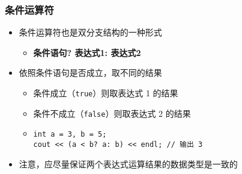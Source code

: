 \begin{frame}[fragile]
    \frametitle{条件运算符}

    \begin{itemize}[<+->]
        \item 条件运算符也是双分支结构的一种形式

            \begin{itemize}
                \item \textbf{条件语句? \enspace 表达式1: \enspace 表达式2}
            \end{itemize}

        \item 依照条件语句是否成立，取不同的结果 

            \begin{itemize}
                \item 条件成立（\lstinline|true|）则取表达式 1 的结果
                \item 条件不成立（\lstinline|false|）则取表达式 2 的结果
                \item \lstinline|int a = 3, b = 5;|\\
                    \lstinline{cout << (a < b? a: b) << endl; // 输出 3}
            \end{itemize}

        \item 注意，应尽量保证两个表达式运算结果的数据类型是一致的
    \end{itemize}
\end{frame}


